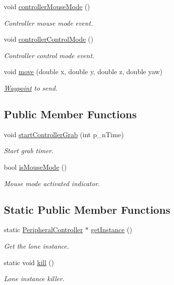\begin{DoxyCompactItemize}
void \hyperlink{class_peripheral_controller_a1bafe7b58e0b2785a542534e3b5ff293}{controller\-Mouse\-Mode} ()
\begin{DoxyCompactList}\small\item\em Controller mouse mode event. \end{DoxyCompactList}\item 
void \hyperlink{class_peripheral_controller_afa2379d5970f0d439be7f4021cc97a29}{controller\-Control\-Mode} ()
\begin{DoxyCompactList}\small\item\em Controller control mode event. \end{DoxyCompactList}\item 
void \hyperlink{class_peripheral_controller_a067b986809255b519175c8e72d97a029}{move} (double x, double y, double z, double yaw)
\begin{DoxyCompactList}\small\item\em \hyperlink{class_waypoint}{Waypoint} to send. \end{DoxyCompactList}\end{DoxyCompactItemize}
\subsection*{Public Member Functions}
\begin{DoxyCompactItemize}
\item 
void \hyperlink{class_peripheral_controller_a4195fba9672f05a4b2ffdcf6279c6f15}{start\-Controller\-Grab} (int p\-\_\-n\-Time)
\begin{DoxyCompactList}\small\item\em Start grab timer. \end{DoxyCompactList}\item 
bool \hyperlink{class_peripheral_controller_ac9a475ad175890c215d7a4dac3d85a9b}{is\-Mouse\-Mode} ()
\begin{DoxyCompactList}\small\item\em Mouse mode activated indicator. \end{DoxyCompactList}\end{DoxyCompactItemize}
\subsection*{Static Public Member Functions}
\begin{DoxyCompactItemize}
\item 
static \hyperlink{class_peripheral_controller}{Peripheral\-Controller} $\ast$ \hyperlink{class_peripheral_controller_abaec1d8c98895893b294da5208e8742e}{get\-Instance} ()
\begin{DoxyCompactList}\small\item\em Get the lone instance. \end{DoxyCompactList}\item 
static void \hyperlink{class_peripheral_controller_ac75c5a8295b60d0707f28a405db86032}{kill} ()
\begin{DoxyCompactList}\small\item\em Lone instance killer. \end{DoxyCompactList}\end{DoxyCompactItemize}


